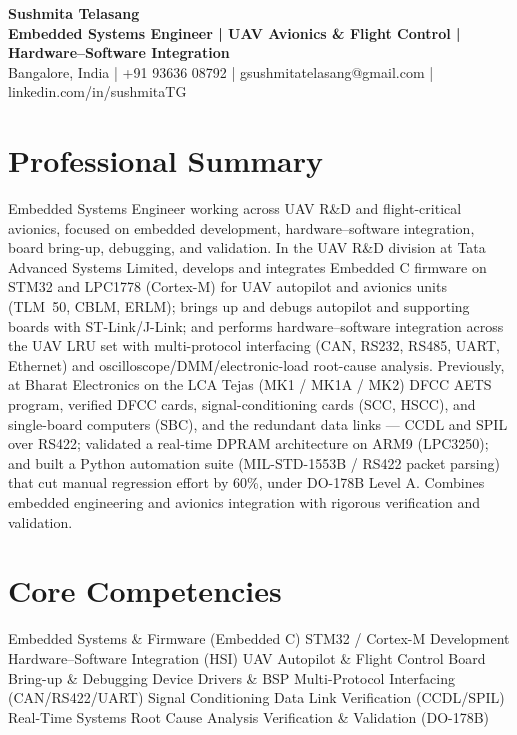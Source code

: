 \documentclass[11pt,a4paper]{article}
\begin{document}
\begin{center}
    {\huge \textbf{Sushmita Telasang}}\\[5pt]
    \textbf{Embedded Systems Engineer \;|\; UAV Avionics \& Flight Control \;|\; Hardware--Software Integration}\\[3pt]
    Bangalore, India \;|\; +91 93636 08792 \;|\; gsushmitatelasang@gmail.com \;|\; linkedin.com/in/sushmitaTG
\end{center}

\section*{Professional Summary}
Embedded Systems Engineer working across UAV R\&D and flight-critical avionics, focused on embedded development, hardware--software integration, board bring-up, debugging, and validation. In the UAV R\&D division at Tata Advanced Systems Limited, develops and integrates Embedded C firmware on STM32 and LPC1778 (Cortex-M) for UAV autopilot and avionics units (TLM~50, CBLM, ERLM); brings up and debugs autopilot and supporting boards with ST-Link/J-Link; and performs hardware--software integration across the UAV LRU set with multi-protocol interfacing (CAN, RS232, RS485, UART, Ethernet) and oscilloscope/DMM/electronic-load root-cause analysis. Previously, at Bharat Electronics on the LCA Tejas (MK1 / MK1A / MK2) DFCC AETS program, verified DFCC cards, signal-conditioning cards (SCC, HSCC), and single-board computers (SBC), and the redundant data links --- CCDL and SPIL over RS422; validated a real-time DPRAM architecture on ARM9 (LPC3250); and built a Python automation suite (MIL-STD-1553B / RS422 packet parsing) that cut manual regression effort by 60\%, under DO-178B Level A. Combines embedded engineering and avionics integration with rigorous verification and validation.

\section*{Core Competencies}
Embedded Systems \& Firmware (Embedded C) \;\textbullet\; STM32 / Cortex-M Development \;\textbullet\; Hardware--Software Integration (HSI) \;\textbullet\; UAV Autopilot \& Flight Control \;\textbullet\; Board Bring-up \& Debugging \;\textbullet\; Device Drivers \& BSP \;\textbullet\; Multi-Protocol Interfacing (CAN/RS422/UART) \;\textbullet\; Signal Conditioning \;\textbullet\; Data Link Verification (CCDL/SPIL) \;\textbullet\; Real-Time Systems \;\textbullet\; Root Cause Analysis \;\textbullet\; Verification \& Validation (DO-178B)
\end{document}
